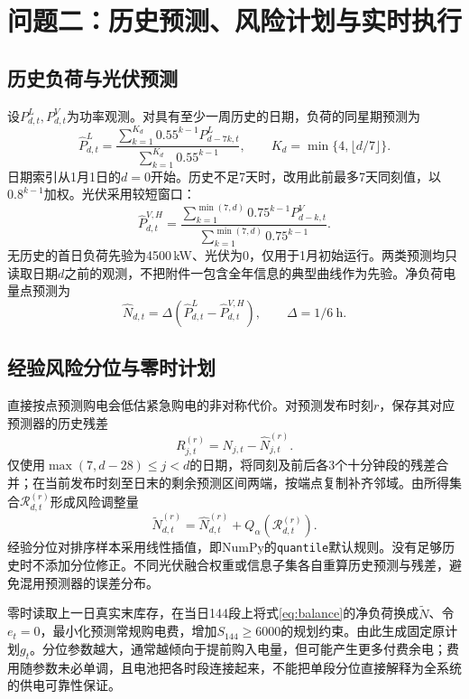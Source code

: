 \section{问题二：历史预测、风险计划与实时执行}
\subsection{历史负荷与光伏预测}
设$P^L_{d,t},P^V_{d,t}$为功率观测。对具有至少一周历史的日期，负荷的同星期预测为
\begin{equation}
 \widehat P^L_{d,t}=\frac{\sum_{k=1}^{K_d}0.55^{k-1}P^L_{d-7k,t}}
 {\sum_{k=1}^{K_d}0.55^{k-1}},\qquad K_d=\min\{4,\lfloor d/7\rfloor\}.
\end{equation}
日期索引从1月1日的$d=0$开始。历史不足7天时，改用此前最多7天同刻值，以$0.8^{k-1}$加权。光伏采用较短窗口：
\begin{equation}
 \widehat P^{V,H}_{d,t}=\frac{\sum_{k=1}^{\min(7,d)}0.75^{k-1}P^V_{d-k,t}}
 {\sum_{k=1}^{\min(7,d)}0.75^{k-1}}.
\end{equation}
无历史的首日负荷先验为4500\,kW、光伏为0，仅用于1月初始运行。两类预测均只读取日期$d$之前的观测，不把附件一包含全年信息的典型曲线作为先验。净负荷电量点预测为
\begin{equation}
 \widehat N_{d,t}=\Delta(\widehat P^L_{d,t}-\widehat P^{V,H}_{d,t}),\qquad\Delta=1/6\ \mathrm{h}.
\end{equation}

\subsection{经验风险分位与零时计划}
直接按点预测购电会低估紧急购电的非对称代价。对预测发布时刻$r$，保存其对应预测器的历史残差
\begin{equation}
 R^{(r)}_{j,t}=N_{j,t}-\widehat N^{(r)}_{j,t}.
\end{equation}
仅使用$\max(7,d-28)\le j<d$的日期，将同刻及前后各3个十分钟段的残差合并；在当前发布时刻至日末的剩余预测区间两端，按端点复制补齐邻域。由所得集合$\mathcal R^{(r)}_{d,t}$形成风险调整量
\begin{equation}
 \widetilde N^{(r)}_{d,t}=\widehat N^{(r)}_{d,t}
   +Q_{\alpha}\!\left(\mathcal R^{(r)}_{d,t}\right).\label{eq:risk}
\end{equation}
经验分位对排序样本采用线性插值，即NumPy的\texttt{quantile}默认规则。没有足够历史时不添加分位修正。不同光伏融合权重或信息子集各自重算历史预测与残差，避免混用预测器的误差分布。

零时读取上一日真实末库存，在当日144段上将式\eqref{eq:balance}的净负荷换成$\widetilde N$、令$e_t=0$，最小化预测常规购电费，增加$S_{144}\ge6000$的规划约束。由此生成固定原计划$g_t$。分位参数越大，通常越倾向于提前购入电量，但可能产生更多付费余电；费用随参数未必单调，且电池把各时段连接起来，不能把单段分位直接解释为全系统的供电可靠性保证。

